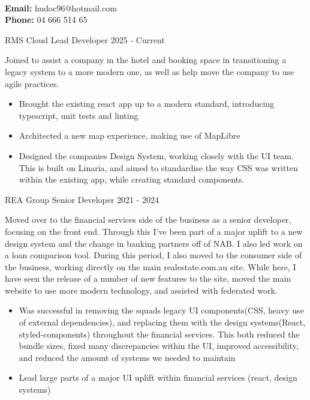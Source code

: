 \documentclass[8pt]{developercv}
\begin{document}
	\begin{minipage}[a]{1.0\textwidth}
		\begin{center}	%
			{ \\}
			\textbf {Email:} hudoc96@hotmail.com \\
			\textbf {Phone:} 04 666 514 65 \\
		\end{center}

		\begin{entrylist}	%
			\entry
				{RMS Cloud}
				{Lead Developer}
				{2025 - Current}
				{Joined to assist a company in the hotel and booking space in transitioning a legacy system to a more modern one, as well as help move the company to use agile practices.
				\begin{itemize}
					\item Brought the existing react app up to a modern standard, introducing typescript, unit tests and linting
					\item Architected a new map experience, making use of MapLibre
					\item Designed the companies Design System, working closely with the UI team. This is built on Linaria, and aimed to standardise the way CSS was written within the existing app, while creating standard components.
				\end{itemize}
				}
			\entry
				{REA Group}
				{Senior Developer}
				{2021 - 2024}
				{Moved over to the financial services side of the business as a senior developer, focusing on the front end. Through this I've been part of a major uplift to a new design system and the change in banking partners off of NAB. I also led work on a loan comparison tool. 
			During this period, I also moved to the consumer side of the business, working directly on the main realestate.com.au site. While here, I have seen the release of a number of new features to the site, moved the main website to use more modern technology, and assisted with federated work.
				\begin{itemize}
					\item Was successful in removing the squads legacy UI components(CSS, heavy use of external dependencies), and replacing them with the design systems(React, styled-components) throughout the financial services. This both reduced the bundle sizes, fixed many discrepancies within the UI, improved accessibility, and reduced the amount of systems we needed to maintain
					\item Lead large parts of a major UI uplift within financial services (react, design systems)

\end{itemize}}
\end{entrylist}
\end{minipage}
\end{document}
